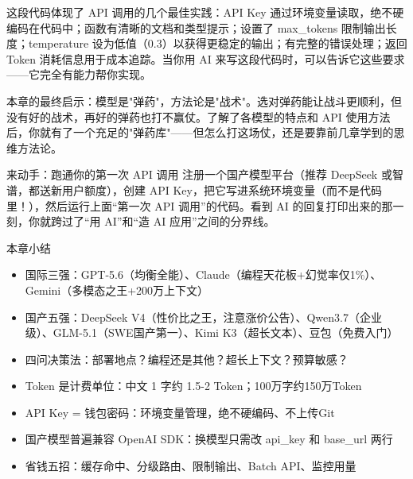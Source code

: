 这段代码体现了 API 调用的几个最佳实践：API Key 通过环境变量读取，绝不硬编码在代码中；函数有清晰的文档和类型提示；设置了 max\_tokens 限制输出长度；temperature 设为低值（0.3）以获得更稳定的输出；有完整的错误处理；返回 Token 消耗信息用于成本追踪。当你用 AI 来写这段代码时，可以告诉它这些要求——它完全有能力帮你实现。

本章的最终启示：模型是"弹药"，方法论是"战术"。选对弹药能让战斗更顺利，但没有好的战术，再好的弹药也打不赢仗。了解了各模型的特点和 API 使用方法后，你就有了一个充足的"弹药库"——但怎么打这场仗，还是要靠前几章学到的思维方法论。

\begin{tcbpractice}{来动手：跑通你的第一次 API 调用}
注册一个国产模型平台（推荐 DeepSeek 或智谱，都送新用户额度），创建 API Key，把它写进系统环境变量（而不是代码里！），然后运行上面“第一次 API 调用”的代码。看到 AI 的回复打印出来的那一刻，你就跨过了“用 AI”和“造 AI 应用”之间的分界线。

\end{tcbpractice}

\begin{tcbsummary}{本章小结}
\begin{itemize}
  \item 国际三强：GPT-5.6（均衡全能）、Claude（编程天花板+幻觉率仅1\%）、Gemini（多模态之王+200万上下文）
  \item 国产五强：DeepSeek V4（性价比之王，注意涨价公告）、Qwen3.7（企业级）、GLM-5.1（SWE国产第一）、Kimi K3（超长文本）、豆包（免费入门）
  \item 四问决策法：部署地点？编程还是其他？超长上下文？预算敏感？
  \item Token 是计费单位：中文 1 字约 1.5-2 Token；100万字约150万Token
  \item API Key = 钱包密码：环境变量管理，绝不硬编码、不上传Git
  \item 国产模型普遍兼容 OpenAI SDK：换模型只需改 api\_key 和 base\_url 两行
  \item 省钱五招：缓存命中、分级路由、限制输出、Batch API、监控用量
\end{itemize}

\end{tcbsummary}

